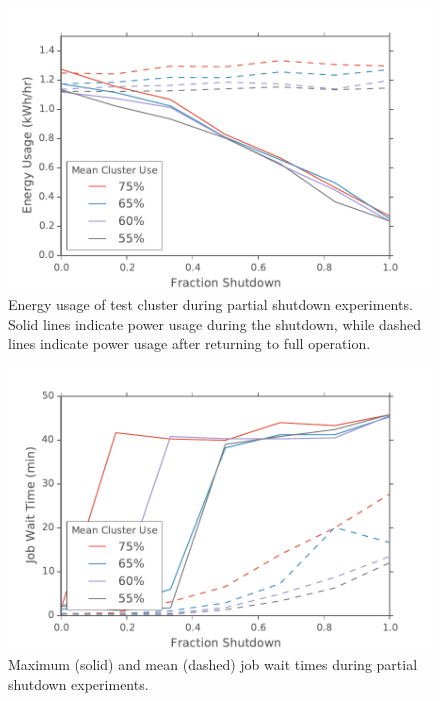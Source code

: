 \begin{figure}[t]
	\begin{center}
		\includegraphics[scale=0.55]{edeals/down_v_pow}
	\end{center}
	\caption{Energy usage of test cluster during partial shutdown experiments.  Solid lines indicate power usage during the shutdown, while dashed lines indicate power usage after returning to full operation.}
	\label{down_v_pow}
\end{figure}

\begin{figure}[t]
	\begin{center}
		\includegraphics[scale=0.55]{edeals/down_v_wait}
	\end{center}
	\caption{Maximum (solid) and mean (dashed) job wait times during partial shutdown experiments.}
	\label{down_v_wait}
\end{figure}

